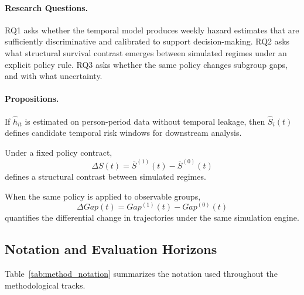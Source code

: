 \paragraph*{Research Questions.}
RQ1 asks whether the temporal model produces weekly hazard estimates that are sufficiently discriminative and calibrated to support decision-making. RQ2 asks what structural survival contrast emerges between simulated regimes under an explicit policy rule. RQ3 asks whether the same policy changes subgroup gaps, and with what uncertainty.

\paragraph*{Propositions.}
\begin{proposition}
If $\hat h_{it}$ is estimated on person-period data without temporal leakage, then $\hat S_i(t)$ defines candidate temporal risk windows for downstream analysis.
\end{proposition}

\begin{proposition}
Under a fixed policy contract,
\begin{equation*}
\Delta S(t)=\bar S^{(1)}(t)-\bar S^{(0)}(t)
\end{equation*}
defines a structural contrast between simulated regimes.
\end{proposition}

\begin{proposition}
When the same policy is applied to observable groups,
\begin{equation*}
\Delta Gap(t)=Gap^{(1)}(t)-Gap^{(0)}(t)
\end{equation*}
quantifies the differential change in trajectories under the same simulation engine.
\end{proposition}

\subsection{Notation and Evaluation Horizons}

Table~\ref{tab:method_notation} summarizes the notation used throughout the methodological tracks.

